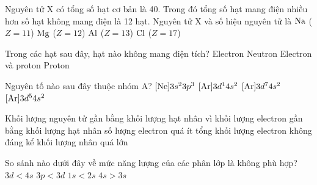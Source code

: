 \documentclass[12pt,a4paper]{article}
\renewcommand{\loigiai}[1]{}
\renewcommand{\True}{}
\begin{document}
\begin{ex}
Nguyên tử X có tổng số hạt cơ bản là 40. Trong đó tổng số hạt mang điện nhiều hơn số hạt không mang điện là 12 hạt. Nguyên tử X và số hiệu nguyên tử là
\choice
{$\ce{Na}$ ($Z = 11$)}
{$\ce{Mg}$ ($Z = 12$)}
{\True $\ce{Al}$ ($Z = 13$)}
{$\ce{Cl}$ ($Z = 17$)}
\loigiai{
Gọi $p, n, e$ là số proton, neutron, electron của X ($p = e$). Ta có:\\
$2p + n = 40$ và $2p - n = 12 \implies 4p = 52 \implies p = 13$ ($\ce{Al}$) và $n = 14$.\\
Số hiệu nguyên tử $Z = p = 13$, X là Aluminium ($\ce{Al}$).\\
\textbf{Chọn C.}
}
\end{ex}

\begin{ex}
Trong các hạt sau đây, hạt nào không mang điện tích?
\choice
{Electron}
{\True Neutron}
{Electron và proton}
{Proton}
\loigiai{
Proton mang điện tích $+1$, electron mang điện tích $-1$, neutron là hạt trung hòa về điện (không mang điện tích).\\
\textbf{Chọn B.}
}
\end{ex}

\begin{ex}
Nguyên tố nào sau đây thuộc nhóm A?
\choice
{\True $[\ce{Ne}]3s^2 3p^3$}
{$[\ce{Ar}]3d^1 4s^2$}
{$[\ce{Ar}]3d^7 4s^2$}
{$[\ce{Ar}]3d^5 4s^2$}
\loigiai{
Nguyên tố nhóm A là các nguyên tố s và p. Cấu hình $[\ce{Ne}]3s^2 3p^3$ có electron cuối cùng điền vào phân lớp 3p nên là nguyên tố p (thuộc nhóm VA). Các cấu hình còn lại là nguyên tố d thuộc nhóm B.\\
\textbf{Chọn A.}
}
\end{ex}

\begin{ex}
Khối lượng nguyên tử gần bằng khối lượng hạt nhân vì
\choice
{khối lượng electron gần bằng khối lượng hạt nhân}
{số lượng electron quá ít}
{\True tổng khối lượng electron không đáng kể}
{khối lượng nhân quá lớn}
\loigiai{
Vì khối lượng của mỗi electron rất nhỏ ($m_e \approx \dfrac{1}{1836} m_p$) nên tổng khối lượng các electron trong lớp vỏ là không đáng kể so với hạt nhân. Do đó khối lượng nguyên tử gần bằng khối lượng hạt nhân.\\
\textbf{Chọn C.}
}
\end{ex}

\begin{ex}
So sánh nào dưới đây về mức năng lượng của các phân lớp là không phù hợp?
\choice
{\True $3d < 4s$}
{$3p < 3d$}
{$1s < 2s$}
{$4s > 3s$}
\loigiai{
Theo thứ tự mức năng lượng tăng dần: $1s < 2s < 2p < 3s < 3p < 4s < 3d...$ Phân lớp 4s có mức năng lượng thấp hơn phân lớp 3d ($4s < 3d$). Do đó so sánh $3d < 4s$ là không phù hợp (sai).\\
\textbf{Chọn A.}
}
\end{ex}
\end{document}
